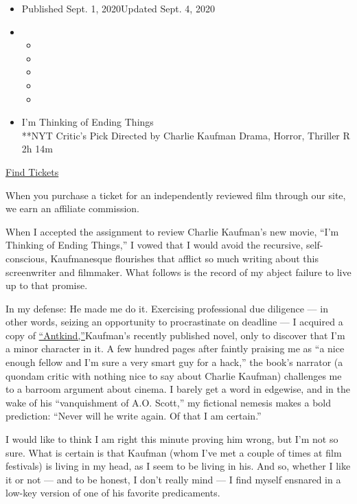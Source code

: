 \begin{itemize}
\item
  Published Sept. 1, 2020Updated Sept. 4, 2020
\item
  \begin{itemize}
  \item
  \item
  \item
  \item
  \item
  \end{itemize}
\end{itemize}

\begin{itemize}
\tightlist
\item
  I'm Thinking of Ending Things\\
  **NYT Critic's Pick Directed by Charlie Kaufman Drama, Horror,
  Thriller R 2h 14m
\end{itemize}

\href{https://www.imdb.com/showtimes/title/tt7939766?ref_=ref_ext_NYT}{Find
Tickets}

When you purchase a ticket for an independently reviewed film through
our site, we earn an affiliate commission.

When I accepted the assignment to review Charlie Kaufman's new movie,
``I'm Thinking of Ending Things,'' I vowed that I would avoid the
recursive, self-conscious, Kaufmanesque flourishes that afflict so much
writing about this screenwriter and filmmaker. What follows is the
record of my abject failure to live up to that promise.

In my defense: He made me do it. Exercising professional due diligence
--- in other words, seizing an opportunity to procrastinate on deadline
--- I acquired a copy of
\href{https://www.nytimes3xbfgragh.onion/2020/07/08/books/review/antkind-charlie-kaufman.html}{``Antkind,''}Kaufman's
recently published novel, only to discover that I'm a minor character in
it. A few hundred pages after faintly praising me as ``a nice enough
fellow and I'm sure a very smart guy for a hack,'' the book's narrator
(a quondam critic with nothing nice to say about Charlie Kaufman)
challenges me to a barroom argument about cinema. I barely get a word in
edgewise, and in the wake of his ``vanquishment of A.O. Scott,'' my
fictional nemesis makes a bold prediction: ``Never will he write again.
Of that I am certain.''

I would like to think I am right this minute proving him wrong, but I'm
not so sure. What is certain is that Kaufman (whom I've met a couple of
times at film festivals) is living in my head, as I seem to be living in
his. And so, whether I like it or not --- and to be honest, I don't
really mind --- I find myself ensnared in a low-key version of one of
his favorite predicaments.

